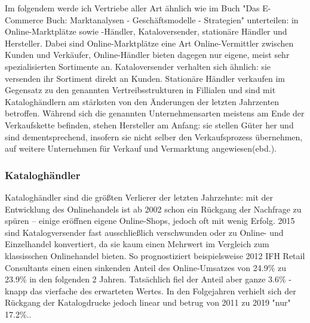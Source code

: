 \begin{folding} %

Im folgendem werde ich Vertriebe aller Art ähnlich wie im Buch "Das E-Commerce Buch: Marktanalysen - Geschäftsmodelle - Strategien" unterteilen: in Online-Marktplätze sowie -Händler, Kataloversender, stationäre Händler und Hersteller\cite[S. 15ff]{Graf}. Dabei sind Online-Marktplätze eine Art Online-Vermittler zwischen Kunden und Verkäufer, Online-Händler bieten dagegen nur eigene, meist sehr spezialisierten Sortimente an. Kataloversender verhalten sich ähnlich: sie versenden ihr Sortiment direkt an Kunden. Stationäre Händler verkaufen im Gegensatz zu den genannten Vertreibsstrukturen in Fillialen und sind mit Kataloghändlern am stärksten von den Änderungen der letzten Jahrzenten betroffen. Während sich die genannten Unternehmensarten meistens am Ende der Verkaufskette befinden, stehen Hersteller am Anfang: sie stellen Güter her und sind dementsprechend, insofern sie nicht selber den Verkaufsprozess übernehmen, auf weitere Unternehmen für Verkauf und Vermarktung angewiesen(ebd.). %

\end{folding}

\begin{folding} \subsubsection{Kataloghändler}

Kataloghändler sind die größten Verlierer der letzten Jahrzehnte: mit der Entwicklung des Onlinehandels ist ab 2002 schon ein Rückgang der Nachfrage zu spüren – einige eröffnen eigene Online-Shops\cite[S. 24f]{Graf}, jedoch oft mit wenig Erfolg\cite[S. 38]{Graf}. 2015 sind Katalogversender fast ausschließlich verschwunden oder zu Online- und Einzelhandel konvertiert, da sie kaum einen Mehrwert im Vergleich zum klassisschen Onlinehandel bieten\cite[S. 47]{Graf}. So prognostiziert beispielsweise 2012 IFH Retail Consultants einen einen sinkenden Anteil des Online-Umsatzes von 24.9\% zu 23.9\% in den folgenden 2 Jahren\cite[S. 20]{evilcom}. Tatsächlich fiel der Anteil aber ganze 3.6\% - knapp das vierfache des erwarteten Wertes. In den Folgejahren verhielt sich der Rückgang der Katalogdrucke jedoch linear und betrug von 2011 zu 2019 "nur" 17.2\%.\cite{statista-katalog}. 

\end{folding}

